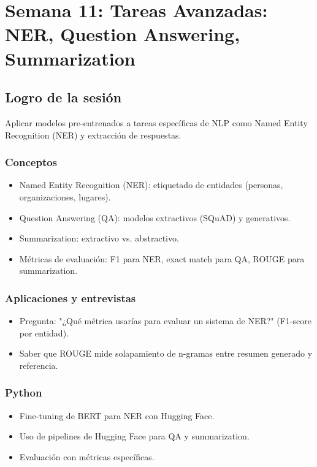 \documentclass[12pt,a4paper,openany,oneside]{book}
\begin{document}
\chapter{Semana 11: Tareas Avanzadas: NER, Question Answering, Summarization}

\section{Logro de la sesión}
Aplicar modelos pre-entrenados a tareas específicas de NLP como Named Entity Recognition (NER) y extracción de respuestas.

\subsection{Conceptos}
\begin{itemize}
    \item Named Entity Recognition (NER): etiquetado de entidades (personas, organizaciones, lugares).
    \item Question Answering (QA): modelos extractivos (SQuAD) y generativos.
    \item Summarization: extractivo vs. abstractivo.
    \item Métricas de evaluación: F1 para NER, exact match para QA, ROUGE para summarization.
\end{itemize}

\subsection{Aplicaciones y entrevistas}
\begin{itemize}
    \item Pregunta: "¿Qué métrica usarías para evaluar un sistema de NER?" (F1-score por entidad).
    \item Saber que ROUGE mide solapamiento de n-gramas entre resumen generado y referencia.
\end{itemize}

\subsection{Python}
\begin{itemize}
    \item Fine-tuning de BERT para NER con Hugging Face.
    \item Uso de pipelines de Hugging Face para QA y summarization.
    \item Evaluación con métricas específicas.
\end{itemize}
\end{document}
